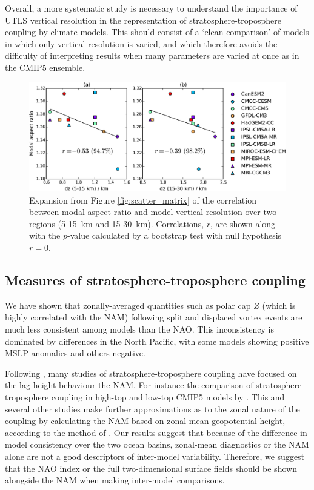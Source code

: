 Overall, a more systematic study is necessary to understand the importance of
UTLS vertical resolution in the representation of stratosphere-troposphere
coupling by climate models. This should consist of a `clean comparison' of
models in which only vertical resolution is varied, and which therefore avoids
the difficulty of interpreting results when many parameters are varied at once
as in the CMIP5 ensemble.




\begin{figure}
 \centering
 \noindent\includegraphics[width=\textwidth]{figures/chapter-models/aspect_ratio_resolution.pdf}
 \caption[Vertical resolution and modal aspect ratio.]{Expansion from Figure
   \ref{fig:scatter_matrix} of the correlation between modal aspect ratio and
   model vertical resolution over two regions (5-15~km and
   15-30~km). Correlations, $r$, are shown along with the $p$-value calculated by a
   bootstrap test with null hypothesis $r=0$.}
 \label{fig:aspect_vert_res}
\end{figure}


\subsection{Measures of stratosphere-troposphere coupling}

We have shown that zonally-averaged quantities such as polar cap $Z$ (which is
highly correlated with the NAM) following split and displaced vortex events are
much less consistent among models than the NAO. This inconsistency is dominated
by differences in the North Pacific, with some models showing positive MSLP
anomalies and others negative.

Following \citet{Baldwin2001a}, many studies of stratosphere-troposphere
coupling have focused on the lag-height behaviour the NAM. For instance the
comparison of stratosphere-troposphere coupling in high-top and low-top CMIP5
models by \citet{Charlton-Perez2013}. This and several other studies make
further approximations as to the zonal nature of the coupling by calculating the
NAM based on zonal-mean geopotential height, according to the method of
\citet{Baldwin2009}. Our results suggest that because of the difference in model
consistency over the two ocean basins, zonal-mean diagnostics or the NAM alone
are not a good descriptors of inter-model variability. Therefore, we suggest
that the NAO index or the full two-dimensional surface fields should be shown
alongside the NAM when making inter-model comparisons.

